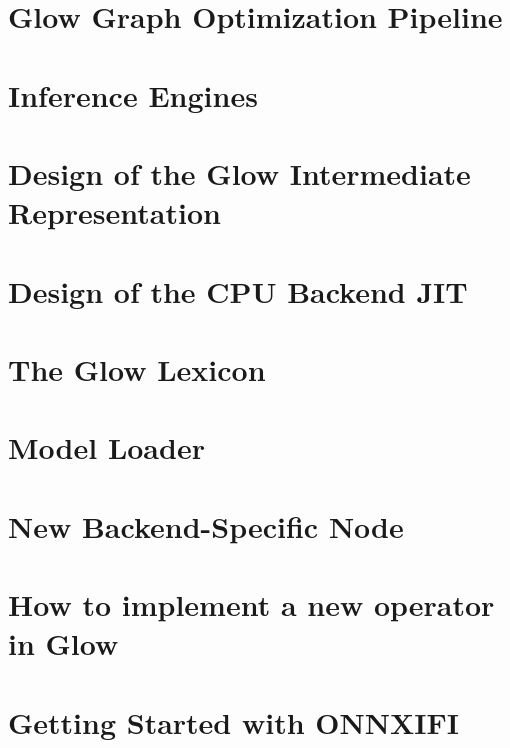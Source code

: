 \documentclass[twoside]{book}
\newcommand{\+}{\discretionary{\mbox{\scriptsize$\hookleftarrow$}}{}{}}
\begin{document}
\chapter{Glow Graph Optimization Pipeline}
\label{md_docs__graph_optimization_pipeline}

\chapter{Inference Engines}
\label{md_docs__inference_engines}

\chapter{Design of the Glow Intermediate Representation}
\label{md_docs__i_r}

\chapter{Design of the C\+PU Backend J\+IT}
\label{md_docs__j_i_t}

\chapter{The Glow Lexicon}
\label{md_docs__lexicon}

\chapter{Model Loader}
\label{md_docs__model_loader}

\chapter{New Backend-\/\+Specific Node}
\label{md_docs__new_backend_specific_node}

\chapter{How to implement a new operator in Glow}
\label{md_docs__new_operators}

\chapter{Getting Started with O\+N\+N\+X\+I\+FI}
\label{md_docs__onnxifi}

\end{document}
